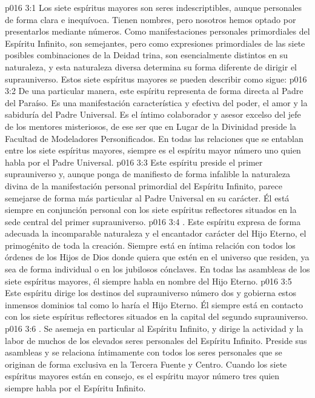 \vs p016 3:1 Los siete espíritus mayores son seres indescriptibles, aunque personales de forma clara e inequívoca. Tienen nombres, pero nosotros hemos optado por presentarlos mediante números. Como manifestaciones personales primordiales del Espíritu Infinito, son semejantes, pero como expresiones primordiales de las siete posibles combinaciones de la Deidad trina, son esencialmente distintos en su naturaleza, y esta naturaleza diversa determina su forma diferente de dirigir el suprauniverso. Estos siete espíritus mayores se pueden describir como sigue:
\vs p016 3:2  De una particular manera, este espíritu representa de forma directa al Padre del Paraíso. Es una manifestación característica y efectiva del poder, el amor y la sabiduría del Padre Universal. Es el íntimo colaborador y asesor excelso del jefe de los mentores misteriosos, de ese ser que en Lugar de la Divinidad preside la Facultad de Modeladores Personificados. En todas las relaciones que se entablan entre los siete espíritus mayores, siempre es el espíritu mayor número uno quien habla por el Padre Universal.
\vs p016 3:3 Este espíritu preside el primer suprauniverso y, aunque ponga de manifiesto de forma infalible la naturaleza divina de la manifestación personal primordial del Espíritu Infinito, parece semejarse de forma más particular al Padre Universal en su carácter. Él está siempre en conjunción personal con los siete espíritus reflectores situados en la sede central del primer suprauniverso.
\vs p016 3:4 \pc {}. Este espíritu expresa de forma adecuada la incomparable naturaleza y el encantador carácter del Hijo Eterno, el primogénito de toda la creación. Siempre está en íntima relación con todos los órdenes de los Hijos de Dios donde quiera que estén en el universo que residen, ya sea de forma individual o en los jubilosos cónclaves. En todas las asambleas de los siete espíritus mayores, él siempre habla en nombre del Hijo Eterno.
\vs p016 3:5 Este espíritu dirige los destinos del suprauniverso número dos y gobierna estos inmensos dominios tal como lo haría el Hijo Eterno. Él siempre está en contacto con los siete espíritus reflectores situados en la capital del segundo suprauniverso.
\vs p016 3:6 \pc {}. Se asemeja en particular al Espíritu Infinito, y dirige la actividad y la labor de muchos de los elevados seres personales del Espíritu Infinito. Preside sus asambleas y se relaciona íntimamente con todos los seres personales que se originan de forma exclusiva en la Tercera Fuente y Centro. Cuando los siete espíritus mayores están en consejo, es el espíritu mayor número tres quien siempre habla por el Espíritu Infinito.
